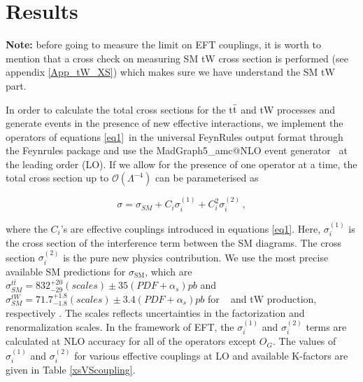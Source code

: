 \clearpage
\section{Results}
\label{tW_Results}

\textbf{Note:} before going to measure the limit on EFT couplings, it is worth to mention that a cross check on measuring SM tW cross section is performed (see appendix \ref{App_tW_XS}) which makes sure we have understand the SM tW part.

\medskip

In order to calculate the total cross sections for the t$\bar{\rm t}$ and tW processes and generate events in the presence of new effective interactions, we implement the operators of equations \ref{eq1}~in the universal FeynRules output format \cite{Degrande:2011ua} through the
Feynrules package \cite{Alloul:2013bka} and use the {\sc MadGraph5\_}a{\sc mc@NLO} event generator~\cite{MADGRAPH,Alwall:2014hca} at the leading order (LO).
If we allow for the presence of one operator at a time, the total cross section up to $\mathcal{O}(\Lambda^{-4})$ can be parameterised as

\begin{equation}
\label{eq:Limit}
        \sigma=\sigma_{SM}+
        C_i\sigma_i^{(1)}+
    C_i^2\sigma_{i}^{(2)}\,,
\end{equation}

where the $C_i$'s are effective  couplings introduced in equations \ref{eq1}. Here, $\sigma_i^{(1)}$ is the cross section of the interference term between the SM diagrams. The cross section $\sigma_i^{(2)}$ is the pure new physics contribution.
We use the most precise available SM predictions for $\sigma_{\text{SM}}$, which are $\sigma_{SM}^{t\bar{t}} = 832^{+20}_{-29}(scales)\pm 35(PDF+\alpha_{s})pb$ and $\sigma_{SM}^{tW} = 71.7^{+1.8}_{-1.8}(scales)\pm 3.4(PDF+\alpha_{s})pb$ for \ttbar~ and tW production, respectively \cite{Czakon:2011xx,Kidonakis:2015nna}.
The scales reflects uncertainties  in  the  factorization and  renormalization scales.
In the framework of EFT, the $\sigma_i^{(1)}$  and $\sigma_i^{(2)}$ terms are calculated at NLO accuracy for all of the operators except $O_G$.
The values of $\sigma_i^{(1)}$ and $\sigma_i^{(2)}$ for various effective couplings at LO and available K-factors are given in Table \ref{xsVScoupling}.



